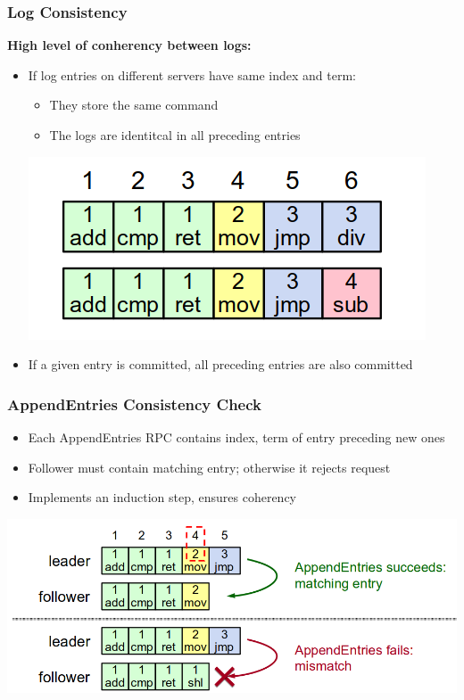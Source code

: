 \begin{frame}
    \frametitle{Log Consistency}
    \textbf{High level of conherency between logs:}
    \begin{itemize}
        \item If log entries on different servers have same index and term:
            \begin{itemize}
                \item They store the same command
                \item The logs are identitcal in all preceding entries
            \end{itemize}
        \includegraphics[scale=0.3]{./figures/raft-log2.png}
        \item If a given entry is committed, all preceding entries are also committed
    \end{itemize}
\end{frame}

\begin{frame}
    \frametitle{AppendEntries Consistency Check}
    \begin{itemize}
        \item Each AppendEntries RPC contains index, term of entry preceding new ones
        \item Follower must contain matching entry; otherwise it rejects request
        \item Implements an \alert{induction step}, ensures coherency
    \end{itemize}
    \includegraphics[scale=0.3]{./figures/raft-consistency.png}
\end{frame}

